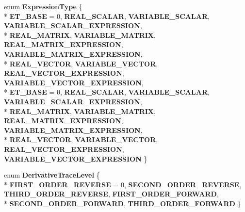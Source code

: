\begin{DoxyCompactItemize}
\item 
\hypertarget{namespaceatl_a9d5ac58a60edcd80977d4b562141d9a3}{enum {\bfseries Expression\+Type} \{ \\*
{\bfseries E\+T\+\_\+\+B\+A\+S\+E} = 0, 
{\bfseries R\+E\+A\+L\+\_\+\+S\+C\+A\+L\+A\+R}, 
{\bfseries V\+A\+R\+I\+A\+B\+L\+E\+\_\+\+S\+C\+A\+L\+A\+R}, 
{\bfseries V\+A\+R\+I\+A\+B\+L\+E\+\_\+\+S\+C\+A\+L\+A\+R\+\_\+\+E\+X\+P\+R\+E\+S\+S\+I\+O\+N}, 
\\*
{\bfseries R\+E\+A\+L\+\_\+\+M\+A\+T\+R\+I\+X}, 
{\bfseries V\+A\+R\+I\+A\+B\+L\+E\+\_\+\+M\+A\+T\+R\+I\+X}, 
{\bfseries R\+E\+A\+L\+\_\+\+M\+A\+T\+R\+I\+X\+\_\+\+E\+X\+P\+R\+E\+S\+S\+I\+O\+N}, 
{\bfseries V\+A\+R\+I\+A\+B\+L\+E\+\_\+\+M\+A\+T\+R\+I\+X\+\_\+\+E\+X\+P\+R\+E\+S\+S\+I\+O\+N}, 
\\*
{\bfseries R\+E\+A\+L\+\_\+\+V\+E\+C\+T\+O\+R}, 
{\bfseries V\+A\+R\+I\+A\+B\+L\+E\+\_\+\+V\+E\+C\+T\+O\+R}, 
{\bfseries R\+E\+A\+L\+\_\+\+V\+E\+C\+T\+O\+R\+\_\+\+E\+X\+P\+R\+E\+S\+S\+I\+O\+N}, 
{\bfseries V\+A\+R\+I\+A\+B\+L\+E\+\_\+\+V\+E\+C\+T\+O\+R\+\_\+\+E\+X\+P\+R\+E\+S\+S\+I\+O\+N}, 
\\*
{\bfseries E\+T\+\_\+\+B\+A\+S\+E} = 0, 
{\bfseries R\+E\+A\+L\+\_\+\+S\+C\+A\+L\+A\+R}, 
{\bfseries V\+A\+R\+I\+A\+B\+L\+E\+\_\+\+S\+C\+A\+L\+A\+R}, 
{\bfseries V\+A\+R\+I\+A\+B\+L\+E\+\_\+\+S\+C\+A\+L\+A\+R\+\_\+\+E\+X\+P\+R\+E\+S\+S\+I\+O\+N}, 
\\*
{\bfseries R\+E\+A\+L\+\_\+\+M\+A\+T\+R\+I\+X}, 
{\bfseries V\+A\+R\+I\+A\+B\+L\+E\+\_\+\+M\+A\+T\+R\+I\+X}, 
{\bfseries R\+E\+A\+L\+\_\+\+M\+A\+T\+R\+I\+X\+\_\+\+E\+X\+P\+R\+E\+S\+S\+I\+O\+N}, 
{\bfseries V\+A\+R\+I\+A\+B\+L\+E\+\_\+\+M\+A\+T\+R\+I\+X\+\_\+\+E\+X\+P\+R\+E\+S\+S\+I\+O\+N}, 
\\*
{\bfseries R\+E\+A\+L\+\_\+\+V\+E\+C\+T\+O\+R}, 
{\bfseries V\+A\+R\+I\+A\+B\+L\+E\+\_\+\+V\+E\+C\+T\+O\+R}, 
{\bfseries R\+E\+A\+L\+\_\+\+V\+E\+C\+T\+O\+R\+\_\+\+E\+X\+P\+R\+E\+S\+S\+I\+O\+N}, 
{\bfseries V\+A\+R\+I\+A\+B\+L\+E\+\_\+\+V\+E\+C\+T\+O\+R\+\_\+\+E\+X\+P\+R\+E\+S\+S\+I\+O\+N}
 \}}\label{namespaceatl_a9d5ac58a60edcd80977d4b562141d9a3}

\item 
\hypertarget{namespaceatl_ae927a16f88618ef8b2aa6f4834968d25}{enum {\bfseries Derivative\+Trace\+Level} \{ \\*
{\bfseries F\+I\+R\+S\+T\+\_\+\+O\+R\+D\+E\+R\+\_\+\+R\+E\+V\+E\+R\+S\+E} = 0, 
{\bfseries S\+E\+C\+O\+N\+D\+\_\+\+O\+R\+D\+E\+R\+\_\+\+R\+E\+V\+E\+R\+S\+E}, 
{\bfseries T\+H\+I\+R\+D\+\_\+\+O\+R\+D\+E\+R\+\_\+\+R\+E\+V\+E\+R\+S\+E}, 
{\bfseries F\+I\+R\+S\+T\+\_\+\+O\+R\+D\+E\+R\+\_\+\+F\+O\+R\+W\+A\+R\+D}, 
\\*
{\bfseries S\+E\+C\+O\+N\+D\+\_\+\+O\+R\+D\+E\+R\+\_\+\+F\+O\+R\+W\+A\+R\+D}, 
{\bfseries T\+H\+I\+R\+D\+\_\+\+O\+R\+D\+E\+R\+\_\+\+F\+O\+R\+W\+A\+R\+D}
 \}}\label{namespaceatl_ae927a16f88618ef8b2aa6f4834968d25}

\end{DoxyCompactItemize}
